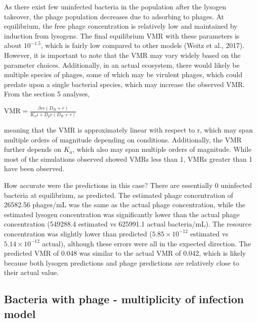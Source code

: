 \documentclass{article}
\begin{document}
As there exist few uninfected bacteria in the population after the lysogen takeover, the phage population decreases due to adsorbing to phages. At equilibrium, the free phage concentration is relatively low and maintained by induction from lysogens. The final equilibrium VMR with these parameters is about $10^{-1.5}$, which is fairly low compared to other models (Weitz et al., 2017). However, it is important to note that the VMR may vary widely based on the parameter choices. Additionally, in an actual ecosystem, there would likely be multiple species of phages, some of which may be virulent phages, which could predate upon a single bacterial species, which may increase the observed VMR. From the section 5 analyses, 

\begin{center}$
\text{VMR} = \frac{\beta r e (D_B + r)}{K_a i + D_pe (D_B + r)}$
\end{center}
meaning that the VMR is approximately linear with respect to r, which may span multiple orders of magnitude depending on conditions. Additionally, the VMR further depends on $K_a$, which also may span multiple orders of magnitude. While most of the simulations observed showed VMRs less than 1, VMRs greater than 1 have been observed.

How accurate were the predictions in this case? There are essentially 0 uninfected bacteria at equilibrium, as predicted. The estimated phage concentration of 26582.56 phages/mL was the same as the actual phage concentration, while the estimated lysogen concentration was significantly lower than the actual phage concentration (549288.4 estimated vs 625991.1 actual bacteria/mL). The resource concentration was slightly lower than predicted ($5.85 \times 10^{-12}$ estimated vs $5.14 \times 10^{-12}$ actual), although these errors were all in the expected direction. The predicted VMR of 0.048 was similar to the actual VMR of 0.042, which is likely because both lysogen predictions and phage predictions are relatively close to their actual value.

\subsection{Bacteria with phage - multiplicity of infection model}
\end{document}
